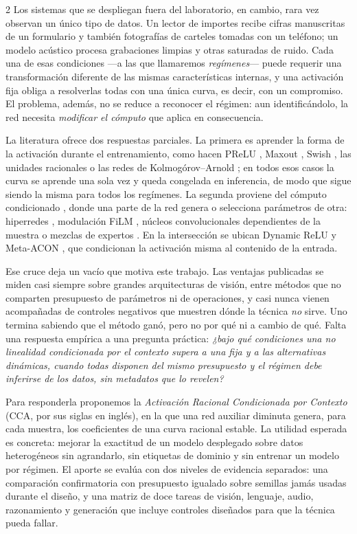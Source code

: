 \begin{multicols}{2}
Los sistemas que se despliegan fuera del laboratorio, en cambio, rara vez observan un único tipo de datos. Un lector de importes recibe cifras manuscritas de un formulario y también fotografías de carteles tomadas con un teléfono; un modelo acústico procesa grabaciones limpias y otras saturadas de ruido. Cada una de esas condiciones —a las que llamaremos \textit{regímenes}— puede requerir una transformación diferente de las mismas características internas, y una activación fija obliga a resolverlas todas con una única curva, es decir, con un compromiso. El problema, además, no se reduce a reconocer el régimen: aun identificándolo, la red necesita \textit{modificar el cómputo} que aplica en consecuencia.

La literatura ofrece dos respuestas parciales. La primera es aprender la forma de la activación durante el entrenamiento, como hacen PReLU \cite{he2015prelu}, Maxout \cite{goodfellow2013maxout}, Swish \cite{ramachandran2017swish}, las unidades racionales \cite{boulle2020rational,molina2020pade} o las redes de Kolmogórov--Arnold \cite{liu2024kan}; en todos esos casos la curva se aprende una sola vez y queda congelada en inferencia, de modo que sigue siendo la misma para todos los regímenes. La segunda proviene del cómputo condicionado \cite{bengio2013conditional}, donde una parte de la red genera o selecciona parámetros de otra: hiperredes \cite{ha2017hypernetworks}, modulación FiLM \cite{perez2018film}, núcleos convolucionales dependientes de la muestra \cite{yang2019condconv} o mezclas de expertos \cite{shazeer2017moe}. En la intersección se ubican Dynamic ReLU \cite{chen2020dynamic} y Meta-ACON \cite{ma2021activate}, que condicionan la activación misma al contenido de la entrada.

Ese cruce deja un vacío que motiva este trabajo. Las ventajas publicadas se miden casi siempre sobre grandes arquitecturas de visión, entre métodos que no comparten presupuesto de parámetros ni de operaciones, y casi nunca vienen acompañadas de controles negativos que muestren dónde la técnica \textit{no} sirve. Uno termina sabiendo que el método ganó, pero no por qué ni a cambio de qué. Falta una respuesta empírica a una pregunta práctica: \emph{¿bajo qué condiciones una no linealidad condicionada por el contexto supera a una fija y a las alternativas dinámicas, cuando todas disponen del mismo presupuesto y el régimen debe inferirse de los datos, sin metadatos que lo revelen?}

Para responderla proponemos la \textit{Activación Racional Condicionada por Contexto} (CCA, por sus siglas en inglés), en la que una red auxiliar diminuta genera, para cada muestra, los coeficientes de una curva racional estable. La utilidad esperada es concreta: mejorar la exactitud de un modelo desplegado sobre datos heterogéneos sin agrandarlo, sin etiquetas de dominio y sin entrenar un modelo por régimen. El aporte se evalúa con dos niveles de evidencia separados: una comparación confirmatoria con presupuesto igualado sobre semillas jamás usadas durante el diseño, y una matriz de doce tareas de visión, lenguaje, audio, razonamiento y generación que incluye controles diseñados para que la técnica pueda fallar.


\end{multicols}
